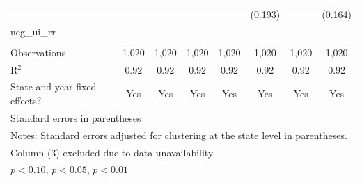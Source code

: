 \begin{table}[htbp]
\begin{tabular}{l*{7}{c}}
                    &                     &                     &                     &                     &     (0.193)         &                     &     (0.164)         \\
\addlinespace
neg\_ui\_rr           &                     &                     &                     &                     &                     &                     &                     \\
                    &                     &                     &                     &                     &                     &                     &                     \\
\midrule
Observations        &       1,020         &       1,020         &       1,020         &       1,020         &       1,020         &       1,020         &       1,020         \\
R$^2$               &        0.92         &        0.92         &        0.92         &        0.92         &        0.92         &        0.92         &        0.92         \\
State and year fixed effects?&         Yes         &         Yes         &         Yes         &         Yes         &         Yes         &         Yes         &         Yes         \\
\bottomrule
\multicolumn{8}{l}{\footnotesize Standard errors in parentheses}\\
\multicolumn{8}{l}{\footnotesize Notes: Standard errors adjusted for clustering at the state level in parentheses.}\\
\multicolumn{8}{l}{\footnotesize Column (3) excluded due to data unavailability.}\\
\multicolumn{8}{l}{\footnotesize \sym{*} \(p<0.10\), \sym{**} \(p<0.05\), \sym{***} \(p<0.01\)}\\
\end{tabular}
\end{table}
